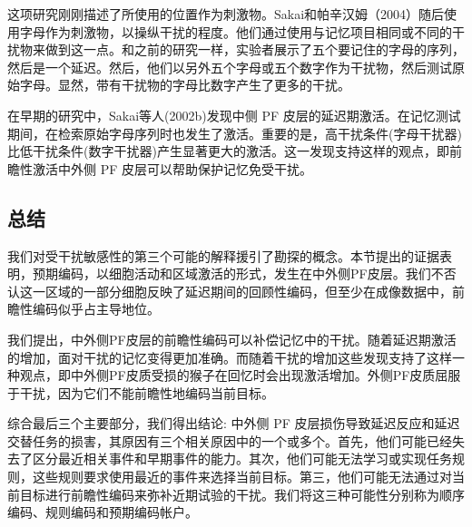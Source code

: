 这项研究刚刚描述了所使用的位置作为刺激物。Sakai和帕辛汉姆（2004）随后使用字母作为刺激物，以操纵干扰的程度。他们通过使用与记忆项目相同或不同的干扰物来做到这一点。和之前的研究一样，实验者展示了五个要记住的字母的序列，然后是一个延迟。然后，他们以另外五个字母或五个数字作为干扰物，然后测试原始字母。显然，带有干扰物的字母比数字产生了更多的干扰。

在早期的研究中，Sakai等人(2002b)发现中侧 PF 皮层的延迟期激活。在记忆测试期间，在检索原始字母序列时也发生了激活。重要的是，高干扰条件(字母干扰器)比低干扰条件(数字干扰器)产生显著更大的激活。这一发现支持这样的观点，即前瞻性激活中外侧 PF 皮层可以帮助保护记忆免受干扰。
\subsection{总结}
我们对受干扰敏感性的第三个可能的解释援引了勘探的概念。本节提出的证据表明，预期编码，以细胞活动和区域激活的形式，发生在中外侧PF皮层。我们不否认这一区域的一部分细胞反映了延迟期间的回顾性编码，但至少在成像数据中，前瞻性编码似乎占主导地位。

我们提出，中外侧PF皮层的前瞻性编码可以补偿记忆中的干扰。随着延迟期激活的增加，面对干扰的记忆变得更加准确。而随着干扰的增加这些发现支持了这样一种观点，即中外侧PF皮质受损的猴子在回忆时会出现激活增加。外侧PF皮质屈服于干扰，因为它们不能前瞻性地编码当前目标。

综合最后三个主要部分，我们得出结论: 中外侧 PF 皮层损伤导致延迟反应和延迟交替任务的损害，其原因有三个相关原因中的一个或多个。首先，他们可能已经失去了区分最近相关事件和早期事件的能力。其次，他们可能无法学习或实现任务规则，这些规则要求使用最近的事件来选择当前目标。第三，他们可能无法通过对当前目标进行前瞻性编码来弥补近期试验的干扰。我们将这三种可能性分别称为顺序编码、规则编码和预期编码帐户。


